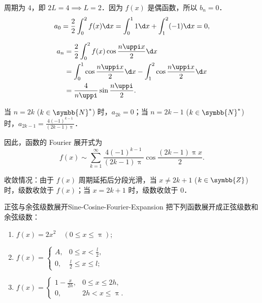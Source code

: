 \begin{solution}
    周期为 $4$，即 $2L = 4 \implies L = 2$．因为 $f(x)$ 是偶函数，所以 $b_n = 0$．
    \begin{equation}
        a_0 = \frac{2}{2} \int_{0}^{2} f(x) \d x = \int_{0}^{1} 1 \d x + \int_{1}^{2} (-1) \d x = 0,
    \end{equation}

    \begin{equation}
        \begin{aligned}
            a_n & = \frac{2}{2} \int_{0}^{2} f(x) \cos \frac{n\uppi x}{2} \d x                            \\
                & = \int_{0}^{1} \cos \frac{n\uppi x}{2} \d x - \int_{1}^{2} \cos \frac{n\uppi x}{2} \d x \\
                & = \frac{4}{n\uppi} \sin \frac{n\uppi}{2}.
        \end{aligned}
    \end{equation}

    当 $n = 2k$ ($k \in \symbb{N}^*$) 时，$a_{2k} = 0$；当 $n = 2k-1$ ($k \in \symbb{N}^*$) 时，$a_{2k-1} = \frac{4(-1)^{k-1}}{(2k-1)\uppi}$．

    因此，函数的 Fourier 展开式为
    \begin{equation}
        \boxed{f(x) \sim \sum_{k=1}^{\infty} \frac{4(-1)^{k-1}}{(2k-1)\uppi} \cos \frac{(2k-1)\uppi x}{2}}.
    \end{equation}

    收敛情况：由于 $f(x)$ 周期延拓后分段光滑，当 $x \neq 2k+1$ ($k \in \symbb{Z}$) 时，级数收敛于 $f(x)$；当 $x = 2k+1$ 时，级数收敛于 $0$．
\end{solution}

\begin{problem}{正弦与余弦级数展开}{Sine-Cosine-Fourier-Expansion}
    把下列函数展开成正弦级数和余弦级数：
    \begin{enumerate}
        \item $f(x) = 2x^2 \quad (0 \leqslant x \leqslant \uppi)$;
        \item $f(x) = \begin{cases} A, & 0 \leqslant x < \frac{l}{2}, \\ 0, & \frac{l}{2} \leqslant x \leqslant l; \end{cases}$
        \item $f(x) = \begin{cases} 1 - \frac{x}{2h}, & 0 \leqslant x \leqslant 2h, \\ 0, & 2h < x \leqslant \uppi. \end{cases}$
    \end{enumerate}
\end{problem}

